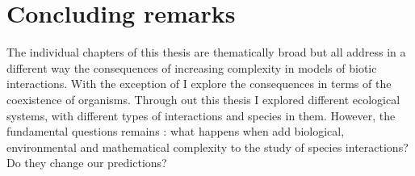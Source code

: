 \documentclass[12pt]{article}
\begin{document}







\section*{Concluding remarks}
The individual chapters of this thesis are thematically broad but all address in a different way the consequences of increasing complexity in models of biotic interactions. With the exception of  I explore the consequences in terms of the coexistence of organisms. Through out this thesis I explored different ecological systems, with different types of interactions and species in them. However, the fundamental questions remains : what happens when add biological, environmental and mathematical complexity to the study of species interactions? Do they change our predictions?




\clearpage


\end{document}
